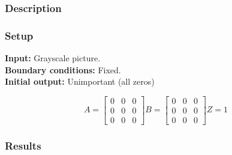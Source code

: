 \begin{multicols}{2}
\subsubsection{Description}
\lipsum[1]
\subsubsection{Setup}

\textbf{Input:} Grayscale picture.\\
\textbf{Boundary conditions:} Fixed.\\
\textbf{Initial output:} Unimportant (all zeros)

\begin{minipage}{0.9\linewidth}
\begin{equation}
A =
\begin{bmatrix}
 0 & 0 & 0 \\
 0 & 0 & 0 \\
 0 & 0 & 0
\end{bmatrix}
B =
\begin{bmatrix}
 0 & 0 & 0 \\
 0 & 0 & 0 \\
 0 & 0 & 0
\end{bmatrix}
Z = 1
\end{equation}
\end{minipage}

\subsubsection{Results}



\end{multicols}
